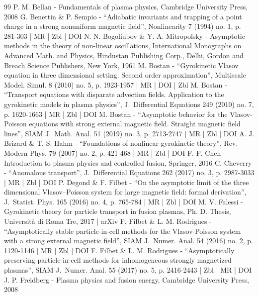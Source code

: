\documentclass[10pt]{amsart}
\theoremstyle{plain}
\theoremstyle{definition}
\begin{document}
\begin{thebibliography}{99}
P. M. Bellan - Fundamentals of plasma physics, Cambridge University Press, 2008
G. Benettin \& P. Sempio - “Adiabatic invariants and trapping of a point charge in a strong nonuniform magnetic field”, Nonlinearity 7 (1994) no. 1, p. 281-303 | MR | Zbl | DOI
N. N. Bogoliubov \& Y. A. Mitropolsky - Asymptotic methods in the theory of non-linear oscillations, International Monographs on Advanced Math. and Physics, Hindustan Publishing Corp., Delhi, Gordon and Breach Science Publishers, New York, 1961
M. Bostan - “Gyrokinetic Vlasov equation in three dimensional setting. Second order approximation”, Multiscale Model. Simul. 8 (2010) no. 5, p. 1923-1957 | MR | DOI | Zbl
M. Bostan - “Transport equations with disparate advection fields. Application to the gyrokinetic models in plasma physics”, J. Differential Equations 249 (2010) no. 7, p. 1620-1663 | MR | Zbl | DOI
M. Bostan - “Asymptotic behavior for the Vlasov-Poisson equations with strong external magnetic field. Straight magnetic field lines”, SIAM J. Math. Anal. 51 (2019) no. 3, p. 2713-2747 | MR | Zbl | DOI
A. J. Brizard \& T. S. Hahm - “Foundations of nonlinear gyrokinetic theory”, Rev. Modern Phys. 79 (2007) no. 2, p. 421-468 | MR | Zbl | DOI
F. F. Chen - Introduction to plasma physics and controlled fusion, Springer, 2016
C. Cheverry - “Anomalous transport”, J. Differential Equations 262 (2017) no. 3, p. 2987-3033 | MR | Zbl | DOI
P. Degond \& F. Filbet - “On the asymptotic limit of the three dimensional Vlasov–Poisson system for large magnetic field: formal derivation”, J. Statist. Phys. 165 (2016) no. 4, p. 765-784 | MR | Zbl | DOI
M. V. Falessi - Gyrokinetic theory for particle transport in fusion plasmas, Ph. D. Thesis, Università di Roma Tre, 2017 | arXiv
F. Filbet \& L. M. Rodrigues - “Asymptotically stable particle-in-cell methods for the Vlasov-Poisson system with a strong external magnetic field”, SIAM J. Numer. Anal. 54 (2016) no. 2, p. 1120-1146 | MR | Zbl | DOI
F. Filbet \& L. M. Rodrigues - “Asymptotically preserving particle-in-cell methods for inhomogeneous strongly magnetized plasmas”, SIAM J. Numer. Anal. 55 (2017) no. 5, p. 2416-2443 | Zbl | MR | DOI
J. P. Freidberg - Plasma physics and fusion energy, Cambridge University Press, 2008

\end{thebibliography}
\end{document}
